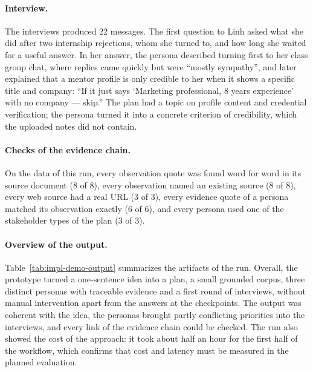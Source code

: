 \paragraph{Interview.} The interviews produced 22 messages. The first question to Linh asked what she did after two internship rejections, whom she turned to, and how long she waited for a useful answer. In her answer, the persona described turning first to her class group chat, where replies came quickly but were ``mostly sympathy'', and later explained that a mentor profile is only credible to her when it shows a specific title and company: ``If it just says `Marketing professional, 8 years experience' with no company --- skip.'' The plan had a topic on profile content and credential verification; the persona turned it into a concrete criterion of credibility, which the uploaded notes did not contain.

\paragraph{Checks of the evidence chain.} On the data of this run, every observation quote was found word for word in its source document (8 of 8), every observation named an existing source (8 of 8), every web source had a real URL (3 of 3), every evidence quote of a persona matched its observation exactly (6 of 6), and every persona used one of the stakeholder types of the plan (3 of 3).

\paragraph{Overview of the output.} Table~\ref{tab:impl-demo-output} summarizes the artifacts of the run. Overall, the prototype turned a one-sentence idea into a plan, a small grounded corpus, three distinct personas with traceable evidence and a first round of interviews, without manual intervention apart from the answers at the checkpoints. The output was coherent with the idea, the personas brought partly conflicting priorities into the interviews, and every link of the evidence chain could be checked. The run also showed the cost of the approach: it took about half an hour for the first half of the workflow, which confirms that cost and latency must be measured in the planned evaluation.


